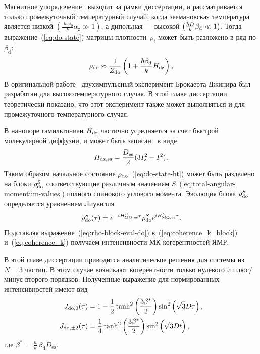 Магнитное упорядочение~\cite{Abragam1982} выходит за рамки диссертации,
и рассматривается только промежуточный температурный случай,
когда зеемановская температура является низкой $({\frac{\hslash \omega_{0}}{k} \alpha_\mathrm{z}}\gg 1)$,
а дипольная --- высокой $\left(  \frac{\hslash{D}}{k}\beta_\mathrm{d} \ll 1 \right)$.
Тогда выражение~(\ref{eq:do-state}) матрицы плотности~$\rho_i$ может быть разложено в ряд по $\beta_\mathrm{d}$:
%
\begin{equation}\label{eq:do-state-ht}
  \rho_\mathrm{do} \approx \frac{1}{Z_\mathrm{do}}\left( 1 + \frac{\hslash\beta_\mathrm{d}}{k} H_\mathrm{dz} \right),
\end{equation}
%
В оригинальной работе~\cite{Jeener1967} двухимпульсный эксперимент Брокаерта-Джинира был разработан для высокотемпературного случая.
В этой главе диссертации теоретически показано,
что этот эксперимент также может выполняться и для промежуточного температурного случая.

В нанопоре гамильтониан $H_\mathrm{dz}$ частично усредняется за счет быстрой молекулярной диффузии,
и может быть записан~\cite{Feldman2004,Doronin2011} в виде
%
\begin{equation}\label{eq:hdz-mean}
  H_\mathrm{dz, es} = \frac{D_\mathrm{es}}{2} (3 I_\mathrm{z}^2 - I^2),
\end{equation}
\hdzEquivaletnSpinsExplanatoryNote
%
Таким образом начальное состояние $\rho_\mathrm{do}$~(\ref{eq:do-state-ht}) может быть разделено на блоки $\rho_\mathrm{do}^S$ соответствующие различным значениям $S$~(\ref{eq:total-angular-momentum-values}) полного спинового углового момента.
Эволюция блока $\rho_\mathrm{do}^S$ определяется уравнением Лиувилля
%
\begin{equation}\label{eq:rho-block-eval-do}
  \rho_\mathrm{do}^S(\tau) = e^{-i H_\mathrm{MQ,es}^S \tau}
    \rho_\mathrm{do}^S e^{i H_\mathrm{MQ,es}^S \tau}.
\end{equation}
%
Подставляя выражение~(\ref{eq:rho-block-eval-do})  в~(\ref{eq:coherence_k_block}) и~(\ref{eq:coherence_k}) получаем интенсивности МК когерентностей ЯМР.

В этой главе диссертации приводится аналитическое решения для системы из $N=3$ частиц.
В этом случае возникают когерентности только нулевого и плюс/минус второго порядков.
Полученные выражение для нормированных интенсивностей имеют вид
%
\begin{align}\label{eq:coherences-n3-do}
    J_{\mathrm{do}, 0}(\tau) & = 1
    - \dfrac 1 2 \tanh^2\left(  \dfrac{3 \beta^* }{2}  \right)
      \sin^2 \left(  \sqrt{3} D\tau  \right),
    \\
    J_{\mathrm{do},\pm2}(\tau) & = \dfrac{1}{4}
      \tanh^2 \left(  \dfrac{3 \beta^*}{2}  \right)
      \sin^2 \left(  \sqrt{3} Dt  \right),
\end{align}
где $\beta^* = {\frac{\hslash}{k} \beta_\mathrm{d} D_\mathrm{es}}$.

